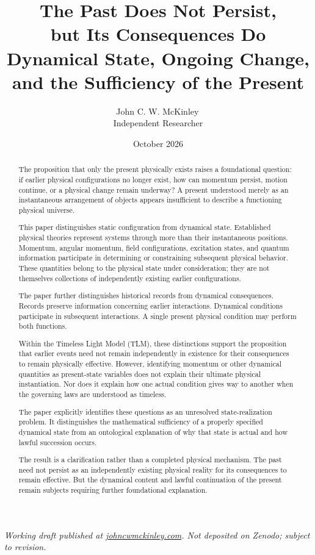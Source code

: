 \documentclass[12pt,onecolumn]{article}
\title{
\textbf{The Past Does Not Persist,}\\
\textbf{but Its Consequences Do}\\[0.4em]
\large Dynamical State, Ongoing Change,
and the Sufficiency of the Present
}
\author{
John C. W. McKinley\,\orcidlink{0009-0005-7097-5035}\\
\small Independent Researcher
}
\date{October 2026}
\begin{document}
\maketitle

\noindent\footnotesize\textit{
Working draft published at \href{https://johncwmckinley.com}{johncwmckinley.com}.
Not deposited on Zenodo; subject to revision.
}\normalsize

\begin{abstract}

The proposition that only the present physically exists raises a foundational question: if earlier physical configurations no longer exist, how can momentum persist, motion continue, or a physical change remain underway? A present understood merely as an instantaneous arrangement of objects appears insufficient to describe a functioning physical universe.

This paper distinguishes static configuration from dynamical state. Established physical theories represent systems through more than their instantaneous positions. Momentum, angular momentum, field configurations, excitation states, and quantum information participate in determining or constraining subsequent physical behavior. These quantities belong to the physical state under consideration; they are not themselves collections of independently existing earlier configurations.

The paper further distinguishes historical records from dynamical consequences. Records preserve information concerning earlier interactions. Dynamical conditions participate in subsequent interactions. A single present physical condition may perform both functions.

Within the Timeless Light Model (TLM), these distinctions support the proposition that earlier events need not remain independently in existence for their consequences to remain physically effective. However, identifying momentum or other dynamical quantities as present-state variables does not explain their ultimate physical instantiation. Nor does it explain how one actual condition gives way to another when the governing laws are understood as timeless.

The paper explicitly identifies these questions as an unresolved state-realization problem. It distinguishes the mathematical sufficiency of a properly specified dynamical state from an ontological explanation of why that state is actual and how lawful succession occurs.

The result is a clarification rather than a completed physical mechanism. The past need not persist as an independently existing physical reality for its consequences to remain effective. But the dynamical content and lawful continuation of the present remain subjects requiring further foundational explanation.

\end{abstract}
\end{document}
